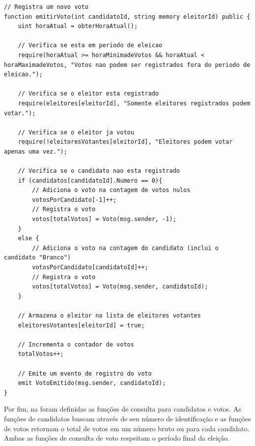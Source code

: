 \documentclass[portuguese]{textolivre}
\begin{document}
\begin{lstlisting}[language=Solidity, label=Codigo-voto, caption={Método para registrar o voto do Contrato Inteligente desenvolvido utilizando Solidity.}, source={Autor.}]
// Registra um novo voto
function emitirVoto(int candidatoId, string memory eleitorId) public {
	uint horaAtual = obterHoraAtual();
	
	// Verifica se esta em periodo de eleicao
	require(horaAtual >= horaMinimadeVotos && horaAtual < horaMaximadeVotos, "Votos nao podem ser registrados fora do periodo de eleicao.");
	
	// Verifica se o eleitor esta registrado
	require(eleitores[eleitorId], "Somente eleitores registrados podem votar.");
	
	// Verifica se o eleitor ja votou
	require(!eleitoresVotantes[eleitorId], "Eleitores podem votar apenas uma vez.");
	
	// Verifica se o candidato nao esta registrado
	if (candidatos[candidatoId].Numero == 0){
		// Adiciona o voto na contagem de votos nulos
		votosPorCandidato[-1]++;
		// Registra o voto
		votos[totalVotos] = Voto(msg.sender, -1);
	}
	else {
		// Adiciona o voto na contagem do candidato (inclui o candidato "Branco")
		votosPorCandidato[candidatoId]++;
		// Registra o voto
		votos[totalVotos] = Voto(msg.sender, candidatoId);
	}
	
	// Armazena o eleitor na lista de eleitores votantes
	eleitoresVotantes[eleitorId] = true;
	
	// Incrementa o contador de votos
	totalVotos++;
	
	// Emite um evento de registro do voto
	emit VotoEmitido(msg.sender, candidatoId);
}
\end{lstlisting} %
	
	
	
	Por fim, na  foram definidas as funções de consulta para candidatos e votos. As funções de candidatos buscam através de seu número de identificação e as funções de votos retornam o total de votos em um número bruto ou para cada candidato. Ambas as funções de consulta de voto respeitam o período final da eleição. 
	
\end{document}
